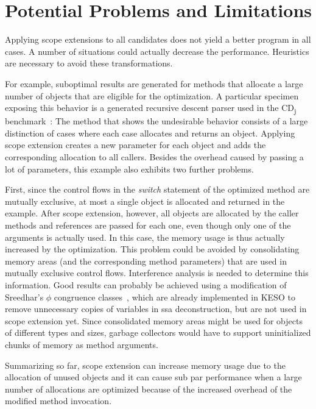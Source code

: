 	\section{Potential Problems and Limitations}
		\label{sec:eea:probs}
		Applying scope extensions to all candidates does not yield a better program in all cases. A number of situations
		could actually decrease the performance. Heuristics are necessary to avoid these transformations.

		For example, suboptimal results are generated for methods that allocate a large number of objects that are eligible
		for the optimization. A particular specimen exposing this behavior is a generated recursive descent parser used in
		the CD\textsubscript{j} benchmark~\cite{kalibera:09:jtres}: The method that shows the undesirable behavior consists
		of a large distinction of cases where each case allocates and returns an object. Applying scope extension creates
		a new parameter for each object and adds the corresponding allocation to all callers. Besides the overhead caused by
		passing a lot of parameters, this example also exhibits two further problems.

		First, since the control flows in the \emph{switch} statement of the optimized method are mutually exclusive, at
		most a single object is allocated and returned in the example. After scope extension, however, all objects are
		allocated by the caller methods and references are passed for each one, even though only one of the arguments is
		actually used. In this case, the memory usage is thus actually increased by the optimization. This problem could be
		avoided by consolidating memory areas (and the corresponding method parameters) that are used in mutually exclusive
		control flows. Interference analysis is needed to determine this information. Good results can probably be achieved
		using a modification of Sreedhar's $\phi$ congruence classes~\cite{sreedhar:99:sas}, which are already implemented
		in KESO to remove unnecessary copies of variables in \gls{ssa} deconstruction, but are not used in scope extension
		yet. Since consolidated memory areas might be used for objects of different types and sizes, garbage collectors
		would have to support uninitialized chunks of memory as method arguments.

		Summarizing so far, scope extension can increase memory usage due to the allocation of unused objects and it can
		cause sub par performance when a large number of allocations are optimized because of the increased overhead of the
		modified method invocation.


